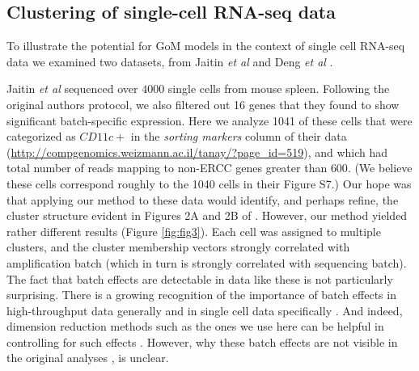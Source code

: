 \subsection{Clustering of single-cell RNA-seq data}

To illustrate the potential for GoM models in the context of single cell RNA-seq data we examined two datasets, from Jaitin \textit{et al} \cite{Jaitin2014} and Deng \textit{et al} \cite{Deng2014}.  

Jaitin \textit{et al} sequenced over $4000$ single cells from mouse spleen. Following the original authors protocol, we also filtered out 16 genes that they found to show significant batch-specific expression. Here we analyze 1041 of these cells that were categorized as $CD11c+$ in the \textit{sorting markers} column of their data (\url{http://compgenomics.weizmann.ac.il/tanay/?page_id=519}), and which had total number of reads mapping to non-ERCC genes greater than $600$. (We believe these cells correspond roughly to the 1040 cells in their Figure S7.)   Our hope was that applying our method to these data would identify, and perhaps refine, the cluster structure evident in Figures 2A and 2B of \cite{Jaitin2014}. However, our method yielded rather different results (Figure \ref{fig:fig3}). Each cell was assigned to multiple clusters, and the cluster membership vectors strongly correlated with amplification batch (which in turn is strongly correlated with sequencing batch). The fact that batch effects are detectable in data like these is not particularly surprising. There is a growing recognition of the importance of batch effects in high-throughput data generally \cite{Leek2010} and in single cell data specifically \cite{Hicks2015}. And indeed, dimension reduction methods such as the ones we use here can be helpful in controlling for such effects \cite{Leek2007} \cite{Stegle2012}. However, why these batch effects are not visible in the original analyses \cite{Jaitin2014}, is unclear. 




